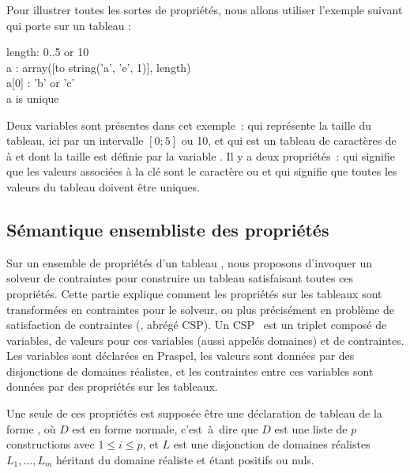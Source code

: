 \begin{example}
\label{example:data:array_proprietes}
Pour illustrer toutes les sortes de propriétés, nous allons utiliser l'exemple
suivant qui porte sur un tableau :

\begin{pre}
length: 0..5 or 10 \\
a     : array([to string('a', 'e', 1)], length) \\
a[0]  : 'b' or 'c' \\
a is unique
\end{pre}

Deux variables sont présentes dans cet exemple~:  qui représente la
taille du tableau, ici par un intervalle $[0; 5]$ ou 10, et  qui est un
tableau de caractères de  à  et dont la taille est définie par
la variable . Il y a deux propriétés~:  qui
signifie que les valeurs associées à la clé  sont le caractère
 ou  et  qui signifie que toutes les
valeurs du tableau doivent être uniques.

\end{example}

\subsection{Sémantique ensembliste des propriétés}
\label{subsection:data:solver_semantics}

Sur un ensemble de propriétés d'un tableau , nous proposons d'invoquer
un solveur de contraintes pour construire un tableau satisfaisant toutes ces
propriétés. Cette partie explique comment les propriétés sur les tableaux sont
transformées en contraintes pour le solveur, ou plus précisément en problème de
satisfaction de contraintes (, abrégé
CSP). Un CSP~ est un triplet composé de variables, de valeurs
pour ces variables (aussi appelés domaines) et de contraintes. Les variables
sont déclarées en Praspel, les valeurs sont données par des disjonctions de
domaines réalistes, et les contraintes entre ces variables sont données par des
propriétés sur les tableaux.

Une seule de ces propriétés est supposée être une déclaration de tableau de la
forme , où $D$ est en forme normale, c'est~à~dire que
$D$ est une liste de $p$ constructions  avec $1 \leq i
\leq p$, et $L$ est une disjonction de domaines réalistes $L_1, \dots, L_m$
héritant du domaine réaliste  et étant positifs ou nuls.

